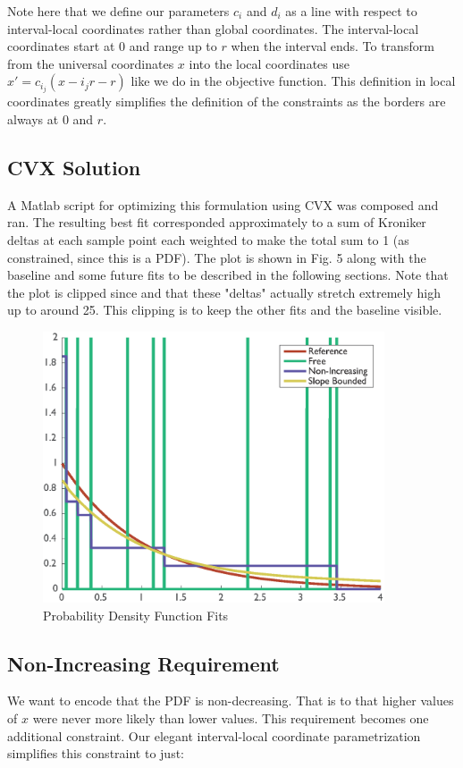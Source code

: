 \documentclass[a4paper]{article}
\begin{document}
Note here that we define our parameters $c_i$ and $d_i$ as a line with respect to interval-local coordinates rather than global coordinates.
The interval-local coordinates start at 0 and range up to $r$ when the interval ends.
To transform from the universal coordinates $x$ into the local coordinates use $x' = c_{i_j}(x - i_j r - r) $ like we do in the objective function.
This definition in local coordinates greatly simplifies the definition of the constraints as the borders are always at 0 and $r$.

\subsection{CVX Solution}
A Matlab script for optimizing this formulation using CVX was composed and ran.
The resulting best fit corresponded approximately to a sum of Kroniker deltas at each sample point each weighted to make the total sum to 1 (as constrained, since this is a PDF).
The plot is shown in Fig. 5 along with the baseline and some future fits to be described in the following sections.
Note that the plot is clipped since and that these "deltas"  actually stretch extremely high up to around 25.
This clipping is to keep the other fits and the baseline visible.

\begin{figure}[ht!]
\centering
\includegraphics[width=0.9\textwidth]{Question3f.eps}
\caption{Probability Density Function Fits}
\end{figure}

\subsection{Non-Increasing Requirement}
We want to encode that the PDF is non-decreasing.
That is to that higher values of $x$ were never more likely than lower values.
This requirement becomes one additional constraint.
Our elegant interval-local coordinate parametrization simplifies this constraint to just:
\end{document}
